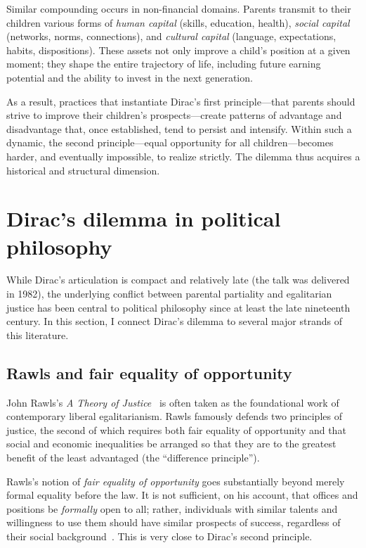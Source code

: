 \documentclass[%
  reprint,
  superscriptaddress,
  amsmath,amssymb,
  pra,
  floatfix,
  longbibliography
]{revtex4-2}
\begin{document}
Similar compounding occurs in non-financial domains.  Parents transmit
to their children various forms of \emph{human capital}
(skills, education, health), \emph{social capital} (networks, norms,
connections), and \emph{cultural capital} (language, expectations,
habits, dispositions).  These assets not only improve a child's position
at a given moment; they shape the entire trajectory of life, including
future earning potential and the ability to invest in the next
generation.

As a result, practices that instantiate Dirac's first principle---that
parents should strive to improve their children's prospects---create
patterns of advantage and disadvantage that, once established, tend to
persist and intensify.  Within such a dynamic, the second
principle---equal opportunity for all children---becomes harder, and
eventually impossible, to realize strictly.  The dilemma thus
acquires a historical and structural dimension.

\section{Dirac's dilemma in political philosophy}

While Dirac's articulation is compact and relatively late (the talk was
delivered in 1982), the underlying conflict between parental partiality
and egalitarian justice has been central to political philosophy since
at least the late nineteenth century.  In this section, I connect
Dirac's dilemma to several major strands of this literature.

\subsection{Rawls and fair equality of opportunity}

John Rawls's \emph{A Theory of Justice}~\cite{Rawls1999} is often taken as
the foundational work of contemporary liberal egalitarianism.  Rawls
famously defends two principles of justice, the second of which requires
both fair equality of opportunity and that social and economic
inequalities be arranged so that they are to the greatest benefit of the
least advantaged (the ``difference principle'').

Rawls's notion of \emph{fair equality of opportunity} goes substantially
beyond merely formal equality before the law.  It is not sufficient,
on his account, that offices and positions be \emph{formally} open to
all; rather, individuals with similar talents and willingness to use
them should have similar prospects of success, regardless of their
social background~\cite[sect.~12, 14]{Rawls1999}.  This is
very close to Dirac's second principle.
\end{document}
